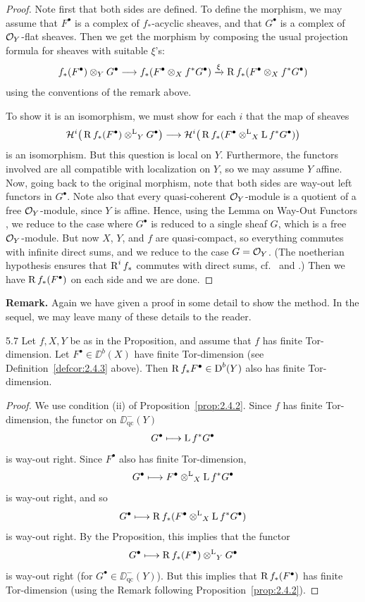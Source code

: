 \begin{proof}
Note first that both sides are defined. To define the morphism, we may assume that $F^\bullet$ is a complex of $f_*$-acyclic sheaves, and that $G^\bullet$ is a complex of $\mathcal{O}_Y$-flat sheaves. Then we get the morphism by composing the usual projection formula for sheaves with suitable $\xi$'s:
\[
f_*(F^\bullet)\otimes_Y G^\bullet \longrightarrow f_*(F^\bullet\otimes_X f^*G^\bullet) \xrightarrow{\xi} \operatorname{R} f_*(F^\bullet\otimes_X f^*G^\bullet)
\]
using the conventions of the remark above.

To show it is an isomorphism, we must show for each $i$ that the map of sheaves
\[
\mathcal{H}^i\big(\operatorname{R} f_*(F^\bullet)\mathbin{\otimes^{\mathrm{L}}}_Y G^\bullet\big) \longrightarrow \mathcal{H}^i\big(\operatorname{R} f_*(F^\bullet\mathbin{\otimes^{\mathrm{L}}}_X \operatorname{L} f^*G^\bullet)\big)
\]
is an isomorphism. But this question is local on $Y$. Furthermore, the functors involved are all compatible with localization on $Y$, so we may assume $Y$ affine. Now, going back to the original morphism, note that both sides are way-out left functors in $G^\bullet$. Note also that every quasi-coherent $\mathcal{O}_Y$-module is a quotient of a free $\mathcal{O}_Y$-module, since $Y$ is affine. Hence, using the Lemma on Way-Out Functors , we reduce to the case where $G^\bullet$ is reduced to a single sheaf $G$, which is a free $\mathcal{O}_Y$-module. But now $X$, $Y$, and $f$ are quasi-compact, so everything commutes with infinite direct sums, and we reduce to the case $G=\mathcal{O}_Y$. (The noetherian hypothesis ensures that $\operatorname{R}^if_*$ commutes with direct sums, cf.\ \cite[.2]{T} and \cite[\nopp II,~\S4.12]{G}.) Then we have $\operatorname{R} f_*(F^\bullet)$ on each side and we are done.
\end{proof}

\textbf{Remark.}
Again we have given a proof in some detail to show the method. In the sequel, we may leave many of these details to the reader.

\begin{bookcorollary}{5.7}\label{cor:2.5.7}
Let $f,X,Y$ be as in the Proposition, and assume that $f$ has finite Tor-dimension. Let $F^\bullet\in\DD^b(X)$ have finite Tor-dimension (see Definition~\ref{defcor:2.4.3} above). Then $\operatorname{R} f_*F^\bullet\in\operatorname{D}^b(Y)$ also has finite Tor-dimension.
\end{bookcorollary}

\begin{proof}
We use condition (ii) of Proposition~\ref{prop:2.4.2}. Since $f$ has finite Tor-dimension, the functor on $\DD_{\mathrm{qc}}^-(Y)$
\[
G^\bullet \longmapsto \operatorname{L} f^*G^\bullet
\]
is way-out right. Since $F^\bullet$ also has finite Tor-dimension,
\[
G^\bullet \longmapsto F^\bullet \mathbin{\otimes^{\mathrm{L}}}_X \operatorname{L} f^*G^\bullet
\]
is way-out right, and so
\[
G^\bullet \longmapsto \operatorname{R} f_*(F^\bullet \mathbin{\otimes^{\mathrm{L}}}_X \operatorname{L} f^*G^\bullet)
\]
is way-out right. By the Proposition, this implies that the functor
\[
G^\bullet \longmapsto \operatorname{R} f_*(F^\bullet) \mathbin{\otimes^{\mathrm{L}}}_Y G^\bullet
\]
is way-out right (for $G^\bullet\in\DD_{\mathrm{qc}}^-(Y)$). But this implies that $\operatorname{R} f_*(F^\bullet)$ has finite Tor-dimension (using the Remark following Proposition~\ref{prop:2.4.2}).
\end{proof}

